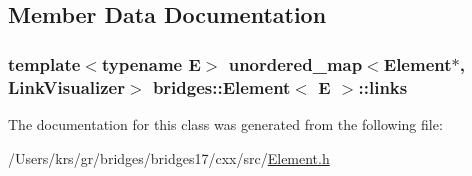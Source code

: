\subsection{Member Data Documentation}
\hypertarget{classbridges_1_1_element_a6fb53728edc378f26238543b26238496}{}
\subsubsection[{links}]{\setlength{\rightskip}{0pt plus 5cm}template$<$typename E$>$ unordered\+\_\+map$<${\bf Element}$\ast$, {\bf Link\+Visualizer}$>$ {\bf bridges\+::\+Element}$<$ E $>$\+::links\hspace{0.3cm}{\ttfamily [protected]}}\label{classbridges_1_1_element_a6fb53728edc378f26238543b26238496}


The documentation for this class was generated from the following file\+:\begin{DoxyCompactItemize}
\item 
/\+Users/krs/gr/bridges/bridges17/cxx/src/\hyperlink{_element_8h}{Element.\+h}\end{DoxyCompactItemize}
